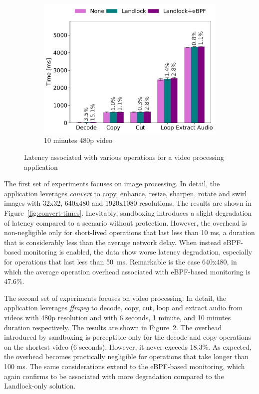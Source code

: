 \begin{figure}[t!]
\begin{center}
\begin{subfigure}[b]{0.5\linewidth}
      \centering
      \includegraphics[width=\linewidth]{chapters/dmng/fig/ffmpeg_100.pdf}
      \caption{10 minutes 480p video}
      \label{fig:ffmpeg100-times}
    \end{subfigure}
  \end{center}
  \caption[Latency of video processing operations]{
      Latency associated with various operations for a video
      processing application
  }
  \label{fig:ffmpeg-times}
\end{figure}

The first set of experiments focuses on image processing. In detail,
the application leverages {\em convert} to copy, enhance, resize,
sharpen, rotate and swirl images with 32x32, 640x480 and 1920x1080
resolutions. The results are shown in
Figure~\ref{fig:convert-times}. Inevitably, sandboxing introduces a
slight degradation of latency compared to a scenario without
protection.  However, the overhead is non-negligible only for
short-lived operations that last less than 10 ms, a duration that is
considerably less than the average network delay. When instead
eBPF-based monitoring is enabled, the data show worse latency
degradation, especially for operations that last less than
50~ms. Remarkable is the case 640x480, in which the average operation
overhead associated with eBPF-based monitoring is 47.6\%.

The second set of experiments focuses on video processing. In detail,
the application leverages {\em ffmpeg} to decode, copy, cut, loop and
extract audio from videos with 480p resolution and with 6 seconds, 1
minute, and 10 minutes duration respectively. The results are shown in
Figure~\ref{fig:ffmpeg-times}. The overhead introduced by sandboxing
is perceptible only for the decode and copy operations on the shortest
video (6 seconds). However, it never exceeds 18.3\%. As expected, the
overhead becomes practically negligible for operations that take
longer than 100 ms. The same considerations extend to the eBPF-based
monitoring, which again confirms to be associated with more
degradation compared to the Landlock-only solution.

